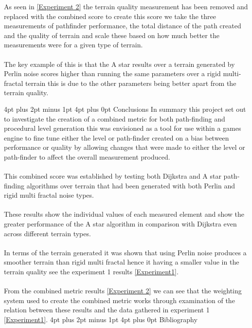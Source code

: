 \documentclass[12pt,a4paper]{article}
\makeatletter
\renewcommand\section{\@startsection {section}{1}{0mm} %
                               {4pt plus 2pt minus 1pt} %
                               {4pt plus 0pt} %
                               {\bfseries}}
\makeatother
\begin{document}
As seen in \ref{Experiment 2} the terrain quality measurement has been removed and replaced with the combined score to create this score we take the three measurements of pathfinder performance, the total distance of the path created and the quality of terrain and scale these based on how much better the measurements were for a given type of terrain.\\\\The key example of this is that the A star results over a terrain generated by Perlin noise scores higher than running the same parameters over a rigid multi-fractal terrain this is due to the other parameters being better apart from the terrain quality.       

\newpage
\section{Conclusions}
In summary this project set out to investigate the creation of a combined metric for both path-finding and procedural level generation this was envisioned as a tool for use within a games engine to fine tune either the level or path-finder created on a bias between performance or quality by allowing changes that were made to either the level or path-finder to affect the overall measurement produced.\\\\This combined score was established by testing both Dijkstra and A star path-finding algorithms over terrain that had been generated with both Perlin and rigid multi fractal noise types.\\\\These results show the individual values of each measured element and show the greater performance of the A star algorithm in comparison with Dijkstra even across different terrain types.\\\\In terms of the terrain generated it was shown that using Perlin noise produces a smoother terrain than rigid multi fractal hence it having a smaller value in the terrain quality see the experiment 1 results \ref{Experiment1}.\\\\ From the combined metric results \ref{Experiment 2} we can see that the weighting system used to create the combined metric works through examination of the relation between these results and the data gathered in experiment 1 \ref{Experiment1}.
\newpage
\section{Bibliography}


\end{document}
